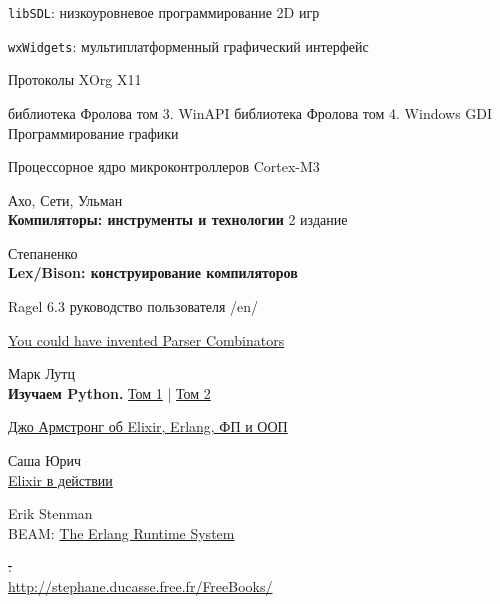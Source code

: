 \begin{thebibliography}{99}
    \secup


 \verb|libSDL|: низкоуровневое программирование 2D игр

 \verb|wxWidgets|: мультиплатформенный графический интерфейс

\secrel{\lin}

 Протоколы XOrg X11

\secrel{\win}

библиотека Фролова том 3. WinAPI
библиотека Фролова том 4. Windows GDI Программирование графики


 Процессорное ядро микроконтроллеров Cortex-M3


 Ахо, Сети, Ульман\\
\textbf{Компиляторы: инструменты и технологии} 2 издание

Степаненко\\
\textbf{Lex/Bison: конструирование компиляторов}

Ragel 6.3 руководство пользователя /en/

\href{http://theorangeduck.com/page/you-could-have-invented-parser-combinators}{You could have invented Parser Combinators}

\secrel{\py}

Марк Лутц\\
\textbf{Изучаем Python.}
\href{https://www.ozon.ru/context/detail/id/156082566/}{Том 1} |
\href{https://www.ozon.ru/context/detail/id/165524776/}{Том 2}

\secrel{\erl/\ex}

\href{https://habr.com/ru/post/450508/}{Джо Армстронг об Elixir, Erlang, ФП и ООП}

Саша Юрич\\
\href{https://www.ozon.ru/context/detail/id/164833016/}{Elixir в действии}

Erik Stenman\\
BEAM:
\href{https://blog.stenmans.org/theBeamBook/}{The Erlang Runtime System}

\secrel{\st}

\st:\\
\url{http://stephane.ducasse.free.fr/FreeBooks/}

\end{thebibliography}

\secup
